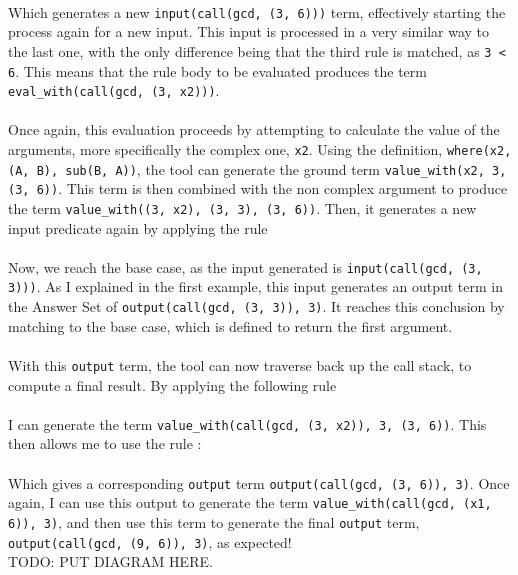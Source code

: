 
\mbox{} \\
Which generates a new \lstinline{input(call(gcd, (3, 6)))} term, effectively starting the process again for a new input. This input is processed in a very similar way to the last one, with the only difference being that the third rule is matched, as \lstinline{3 < 6}. This means that the rule body to be evaluated produces the term \lstinline{eval_with(call(gcd, (3, x2)))}. \\ \\%
Once again, this evaluation proceeds by attempting to calculate the value of the arguments, more specifically the complex one, \lstinline{x2}. Using the definition, \lstinline{where(x2, (A, B), sub(B, A))}, the tool can generate the ground term \lstinline{value_with(x2, 3, (3, 6))}. This term is then combined with the non complex argument to produce the term \lstinline{value_with((3, x2), (3, 3), (3, 6))}. Then, it generates a new input predicate again by applying the rule \\ 


\mbox{} \\
Now, we reach the base case, as the input generated is \lstinline{input(call(gcd, (3, 3)))}. As I explained in the first example, this input generates an output term in the Answer Set of \lstinline{output(call(gcd, (3, 3)), 3)}. It reaches this conclusion by matching to the base case, which is defined to return the first argument. \\ \\
With this \lstinline{output} term, the tool can now traverse back up the call stack, to compute a final result. By applying the following rule \\ %


\mbox{} \\
I can generate the term \lstinline{value_with(call(gcd, (3, x2)), 3, (3, 6))}. This then allows me to use the rule : \\%


\mbox{} \\
Which gives a corresponding \lstinline{output} term \lstinline{output(call(gcd, (3, 6)), 3)}. Once again, I can use this output to generate the term \lstinline{value_with(call(gcd, (x1, 6)), 3)}, and then use this term to generate the final \lstinline{output} term, \lstinline{output(call(gcd, (9, 6)), 3)}, as expected! \\ %
TODO: PUT DIAGRAM HERE.

\pagebreak
%
%